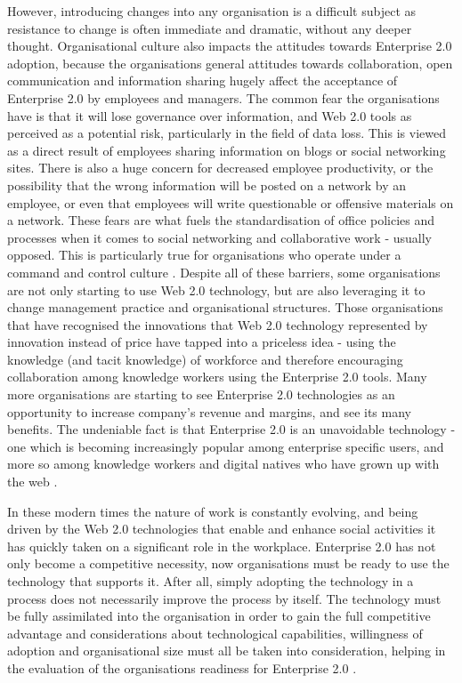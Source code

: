 However, introducing changes into any organisation is a difficult subject as resistance to change is often immediate and dramatic, without any deeper thought. Organisational culture also impacts the attitudes towards Enterprise 2.0 adoption, because the organisations general attitudes towards collaboration, open communication and information sharing hugely affect the acceptance of Enterprise 2.0 by employees and managers. The common fear the organisations have is that it will lose governance over information, and Web 2.0 tools as perceived as a potential risk, particularly in the field of data loss. This is viewed as a direct result of employees sharing information on blogs or social networking sites. There is also a huge concern for decreased employee productivity, or the possibility that the wrong information will be posted on a network by an employee, or even that employees will write questionable or offensive materials on a network. These fears are what fuels the standardisation of office policies and processes when it comes to social networking and collaborative work - usually opposed. This is particularly true for organisations who operate under a command and control culture \cite{williams2013enterprise}. Despite all of these barriers, some organisations are not only starting to use Web 2.0 technology, but are also leveraging it to change management practice and organisational structures. Those organisations that have recognised the innovations that Web 2.0 technology represented by innovation instead of price have tapped into a priceless idea - using the knowledge (and tacit knowledge) of workforce and therefore encouraging collaboration among knowledge workers using the Enterprise 2.0 tools. Many more organisations are starting to see Enterprise 2.0 technologies as an opportunity to increase company's revenue and margins, and see its many benefits. The undeniable fact is that Enterprise 2.0 is an unavoidable technology - one which is becoming increasingly popular among enterprise specific users, and more so among knowledge workers and digital natives who have grown up with the web \cite{kim2013building}. 

In these modern times the nature of work is constantly evolving, and being driven by the Web 2.0 technologies that enable and enhance social activities it has quickly taken on a significant role in the workplace. Enterprise 2.0 has not only become a competitive necessity, now organisations must be ready to use the technology that supports it. After all, simply adopting the technology in a process does not necessarily improve the process by itself. The technology must be fully assimilated into the organisation in order to gain the full competitive advantage and considerations about technological capabilities, willingness of adoption and organisational size must all be taken into consideration, helping in the evaluation of the organisations readiness for Enterprise 2.0 \cite{mcafee2009enterprise}.

